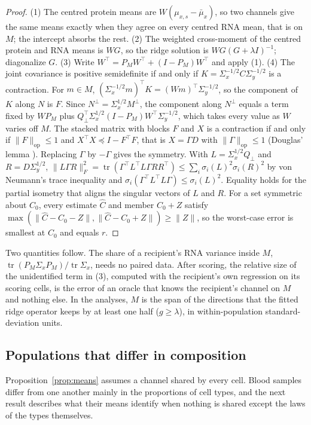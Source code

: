 \begin{proof}
(1) The centred protein means are $W(\mu_{x,s}-\bar\mu_x)$, so two channels
give the same means exactly when they agree on every centred RNA mean, that is
on $M$; the intercept absorbs the rest. (2) The weighted cross-moment of the
centred protein and RNA means is $WG$, so the ridge solution is
$WG(G+\lambda I)^{-1}$; diagonalize $G$. (3) Write
$W^\top=P_MW^\top+(I-P_M)W^\top$ and apply (1). (4) The joint covariance is
positive semidefinite if and only if $K=\Sigma_x^{-1/2}C\Sigma_y^{-1/2}$ is a
contraction. For $m\in M$,
$(\Sigma_x^{-1/2}m)^\top K=(Wm)^\top\Sigma_y^{-1/2}$, so the component of $K$
along $N$ is $F$. Since $N^\perp=\Sigma_x^{1/2}M^\perp$, the component along
$N^\perp$ equals a term fixed by $WP_M$ plus
$Q_\perp^\top\Sigma_x^{1/2}(I-P_M)W^\top\Sigma_y^{-1/2}$, which takes every
value as $W$ varies off $M$. The stacked matrix with blocks $F$ and $X$ is a
contraction if and only if $\|F\|_{\mathrm{op}}\le1$ and
$X^\top X\preceq I-F^\top F$, that is $X=\Gamma D$
with $\|\Gamma\|_{\mathrm{op}}\le1$ (Douglas' lemma \cite{douglas1966}). Replacing $\Gamma$ by
$-\Gamma$ gives the symmetry. With $L=\Sigma_x^{1/2}Q_\perp$ and
$R=D\Sigma_y^{1/2}$, $\|L\Gamma R\|_F^2=\operatorname{tr}(\Gamma^\top
L^\top L\Gamma RR^\top)\le\sum_i\sigma_i(L)^2\sigma_i(R)^2$ by von Neumann's
trace inequality and $\sigma_i(\Gamma^\top L^\top L\Gamma)\le\sigma_i(L)^2$.
Equality holds for the partial isometry that aligns the singular vectors of
$L$ and $R$. For a set symmetric about $C_0$, every estimate $\hat C$ and
member $C_0+Z$ satisfy
$\max(\|\hat C-C_0-Z\|,\|\hat C-C_0+Z\|)\ge\|Z\|$, so the worst-case error is
smallest at $C_0$ and equals $r$.
\end{proof}

Two quantities follow. The share of a recipient's RNA variance inside $M$,
$\operatorname{tr}(P_M\Sigma_xP_M)/\operatorname{tr}\Sigma_x$, needs no paired
data. After scoring, the relative size of the unidentified term in (3),
computed with the recipient's own regression on its scoring cells, is the
error of an oracle that knows the recipient's channel on $M$ and nothing else.
In the analyses, $M$ is the span of the directions that the fitted ridge
operator keeps by at least one half ($g\ge\lambda$), in within-population
standard-deviation units.

\subsection*{Populations that differ in composition}
Proposition~\ref{prop:means} assumes a channel shared by every cell. Blood
samples differ from one another mainly in the proportions of cell types, and
the next result describes what their means identify when nothing is shared
except the laws of the types themselves.

